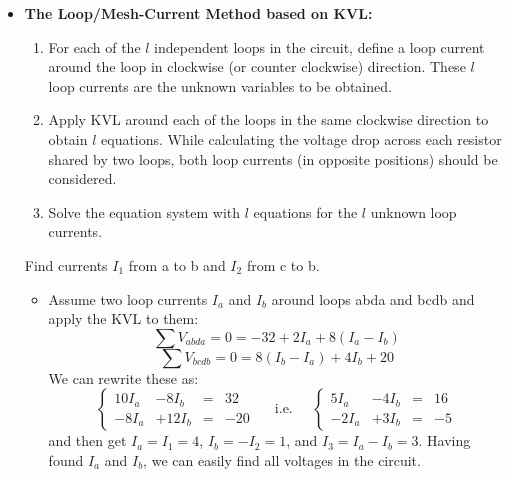 \begin{itemize}
\begin{comment}
  Note that equations from KCL at node d and KVL to other loops are not
  independent. In general, if a circuit has n nodes and b branches, then
  there are $(n-1)$ independent node equations and $l=b-(n-1)$ independent 
  loop equations. In other words, the sum of the number of independent loops
  and the number of independent nodes is always the same as the number of 
  branches, i.e., the number of equations is always equal to the number of 
  unknowns in the branch current method.
\end{comment}

\item {\bf The Loop/Mesh-Current Method based on KVL:}
  \begin{enumerate} 
  \item For each of the $l$ independent loops in the circuit, define a 
    loop current around the loop in clockwise (or counter clockwise)
    direction. These $l$ loop currents are the unknown variables to
    be obtained.
  \item Apply KVL around each of the loops in the same clockwise 
    direction to obtain $l$ equations. While calculating the voltage 
    drop across each resistor shared by two loops, both loop currents 
    (in opposite positions) should be considered.
  \item Solve the equation system with $l$ equations for the $l$ unknown
    loop currents.
  \end{enumerate}
  

  Find currents $I_1$ from a to b and $I_2$ from c to b.

  \begin{itemize}

  \item Assume two loop currents $I_a$ and $I_b$ around loops abda and bcdb 
    and apply the KVL to them:
    \[ \sum V_{abda} =0=-32+2I_a+8(I_a-I_b) \]
    \[ \sum V_{bcdb} =0=8(I_b-I_a)+4I_b+20  \]
    We can rewrite these as:
    \[
    \left\{ \begin{array}{rrrr} 10I_a&-8I_b&=&32 \\ -8I_a &+12I_b&=&-20
    \end{array} \right. 
    \;\;\;\;\;\mbox{i.e.}\;\;\;\;\;
    \left\{ \begin{array}{rrrr} 5I_a&-4I_b&=&16 \\ -2I_a &+3I_b&=&-5
    \end{array} \right. 
    \]
    and then get $I_a=I_1=4$, $I_b=-I_2=1$, and $I_3=I_a-I_b=3$. Having 
    found $I_a$ and $I_b$, we can easily find all voltages in the circuit.
    

\end{itemize}
\end{itemize}
